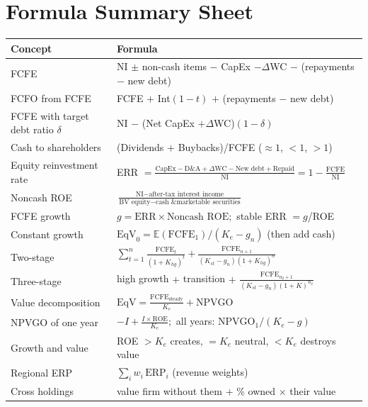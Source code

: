 \section{Formula Summary Sheet}
\begin{center}
\small
\renewcommand{\arraystretch}{1.5}
\begin{longtable}{@{}p{4.6cm}p{10.4cm}@{}}
\toprule
\textbf{Concept} & \textbf{Formula}\\
\midrule
\endhead
FCFE & NI $\pm$ non-cash items $-$ CapEx $-\Delta$WC $-$ (repayments $-$ new debt)\\
FCFO from FCFE & FCFE $+$ Int$(1-t)$ $+$ (repayments $-$ new debt)\\
FCFE with target debt ratio $\delta$ & NI $-$ (Net CapEx $+\Delta$WC)$(1-\delta)$\\
Cash to shareholders & (Dividends $+$ Buybacks)/FCFE ($\approx1$, $<1$, $>1$)\\
Equity reinvestment rate & ERR $=\frac{\text{CapEx}-\text{D\&A}+\Delta\text{WC}-\text{New debt}+\text{Repaid}}{\text{NI}}=1-\frac{\text{FCFE}}{\text{NI}}$\\
Noncash ROE & $\frac{\text{NI}-\text{after-tax interest income}}{\text{BV equity}-\text{cash \& marketable securities}}$\\
FCFE growth & $g=\text{ERR}\times\text{Noncash ROE}$;\ stable ERR $=g$/ROE\\
Constant growth & $\text{EqV}_0=\mathbb{E}(\text{FCFE}_1)/(K_e-g_n)$ (then add cash)\\
Two-stage & $\sum_{t=1}^n\frac{\text{FCFE}_t}{(1+K_{hg})^t}+\frac{\text{FCFE}_{n+1}}{(K_{st}-g_n)(1+K_{hg})^n}$\\
Three-stage & high growth $+$ transition $+$ $\frac{\text{FCFE}_{n_2+1}}{(K_{st}-g_n)(1+K)^{n_2}}$\\
Value decomposition & $\text{EqV}=\frac{\text{FCFE}_{\text{steady}}}{K_e}+\text{NPVGO}$\\
NPVGO of one year & $-I+\frac{I\times\text{ROE}}{K_e}$;\ all years: $\text{NPVGO}_1/(K_e-g)$\\
Growth and value & ROE $>K_e$ creates, $=K_e$ neutral, $<K_e$ destroys value\\
Regional ERP & $\sum_i w_i\,\text{ERP}_i$ (revenue weights)\\
Cross holdings & value firm without them $+$ \% owned $\times$ their value\\
\bottomrule
\end{longtable}
\end{center}

